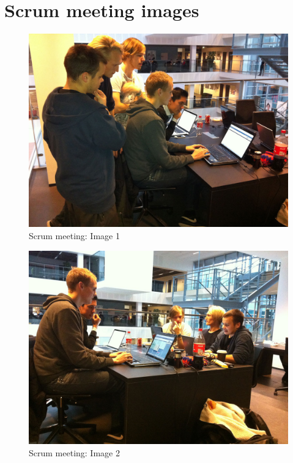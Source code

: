 \section{Scrum meeting images}
\label{sec:scrum-meeting-images}

\begin{figure}[htb]
	\centering
	\includegraphics[width=1\textwidth]{Appendices/graphics/scrum_pic1.jpg}
	\caption{Scrum meeting: Image 1}
	\label{fig:scrum-image-1}
\end{figure}

\begin{figure}[htb]
	\centering
	\includegraphics[width=1\textwidth]{Appendices/graphics/scrum_pic2.jpg}
	\caption{Scrum meeting: Image 2}
	\label{fig:scrum-image-2}
\end{figure}
